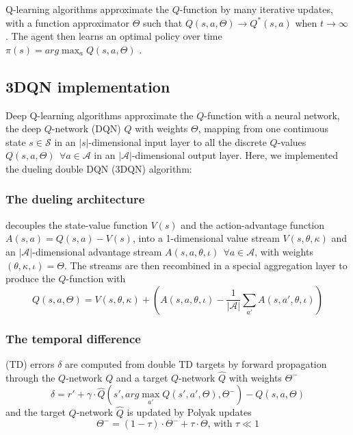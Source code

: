 \documentclass[journal]{IEEEtran}
\begin{document}
Q-learning algorithms approximate the $Q$-function by many iterative updates, with a function approximator $\Theta$ such that $Q(s,a,\Theta) \rightarrow Q^*(s,a)$ when $t \rightarrow \infty$. The agent then learns an optimal policy over time $\pi(s) = arg \max_a Q(s,a,\Theta)$ \cite{sutton2018reinforcement}.

\subsection{3DQN implementation}

Deep Q-learning algorithms approximate the $Q$-function with a neural network, the deep $Q$-network (DQN) \cite{hessel2017rainbow,mnih2013playing,mnih2015human} $Q$ with weights $\Theta$, mapping from one continuous state $s \in \mathcal{S}$ in an $|s|$-dimensional input layer to all the discrete $Q$-values $Q(s,a,\Theta) \:\: \forall a \in \mathcal{A}$ in an $|\mathcal{A}|$-dimensional output layer. Here, we implemented the dueling double DQN (3DQN) algorithm: \\

\subsubsection{The dueling architecture} \cite{wang2016dueling} decouples the state-value function $V(s)$ and the action-advantage function $A(s,a) = Q(s,a) - V(s)$, into a 1-dimensional value stream $V(s,\theta,\kappa)$ and an $|\mathcal{A}|$-dimensional advantage stream $A(s,a,\theta,\iota) \:\: \forall a \in \mathcal{A}$, with weights $(\theta,\kappa,\iota) = \Theta$. The streams are then recombined in a special aggregation layer to produce the $Q$-function with
\[ Q(s,a,\Theta) = V(s,\theta,\kappa) + (A(s,a,\theta,\iota) - \frac{1}{|\mathcal{A}|}\sum_{a'} A(s,a',\theta,\iota) ) \]

\subsubsection{The temporal difference} (TD) errors $\delta$ are computed from double TD targets \cite{hasselt2015deep} by forward propagation through the $Q$-network $Q$ and a target $Q$-network $\widehat{Q}$ with weights $\Theta^-$
\[ \delta = r' + \gamma \cdot \widehat{Q}(s', arg \max_{a'} Q(s',a',\Theta), \Theta^-) - Q(s,a,\Theta)\]
and the target $Q$-network $\widehat{Q}$ is updated by Polyak updates \cite{lillicrap2019continuous}
\[ \Theta^- = (1 - \tau) \cdot \Theta^- + \tau \cdot \Theta \text{, with } \tau \ll 1\]
\end{document}
